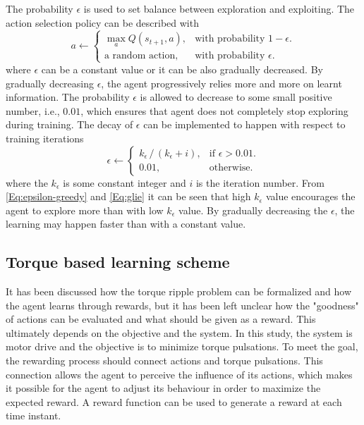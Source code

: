 The probability $\epsilon$ is used to set balance between exploration and exploiting. The action selection policy can be described with \cite{RL:Sutton-Barto}
\begin{equation}
  a \leftarrow \begin{cases}
    \max_{a}Q(s_{t+1}, a),  & \text{with probability $1 - \epsilon$}.\\
    \text{a random action}, & \text{with probability $\epsilon$}.
  \end{cases}
  \label{Eq:epsilon-greedy}
\end{equation}
where $\epsilon$ can be a constant value or it can be also gradually decreased. By gradually decreasing $\epsilon$, the agent progressively relies more and more on learnt information. The probability $\epsilon$ is allowed to decrease to some small positive number, i.e., $0.01$, which ensures that agent does not completely stop exploring during training. The decay of $\epsilon$ can be implemented to happen with respect to training iterations
\begin{equation}
  \epsilon \leftarrow \begin{cases}
    k_\epsilon \,/\,(k_\epsilon + i), & \text{if $\epsilon > 0.01$}.\\
    0.01,        & \text{otherwise}.
  \end{cases}
  \label{Eq:glie}
\end{equation}
where the $k_\epsilon$ is some constant integer and $i$ is the iteration number. From \eqref{Eq:epsilon-greedy} and \eqref{Eq:glie} it can be seen that high $k_\epsilon$ value encourages the agent to explore more than with low $k_\epsilon$ value. By gradually decreasing the $\epsilon$, the learning may happen faster than with a constant value.


\subsection{Torque based learning scheme}
It has been discussed how the torque ripple problem can be formalized and how the agent learns through rewards, but it has been left unclear how the "goodness" of actions can be evaluated and what should be given as a reward. This ultimately depends on the objective and the system. In this study, the system is motor drive and the objective is to minimize torque pulsations. To meet the goal, the rewarding process should connect actions and torque pulsations. This connection allows the agent to perceive the influence of its actions, which makes it possible for the agent to adjust its behaviour in order to maximize the expected reward. A reward function can be used to generate a reward at each time instant.

